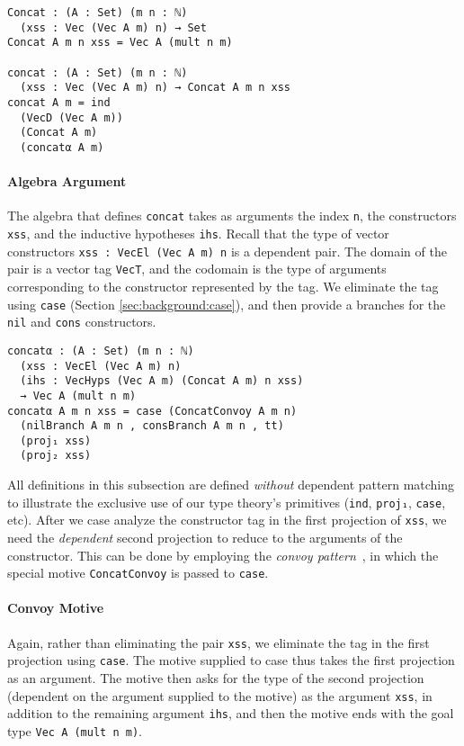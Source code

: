 \documentclass[preprint,nonatbib]{sigplanconf}
\newcommand{\refsec}[1]{Section \ref{sec:#1}}
\begin{document}
\begin{verbatim}
Concat : (A : Set) (m n : ℕ)
  (xss : Vec (Vec A m) n) → Set
Concat A m n xss = Vec A (mult n m)

concat : (A : Set) (m n : ℕ)
  (xss : Vec (Vec A m) n) → Concat A m n xss
concat A m = ind
  (VecD (Vec A m))
  (Concat A m)
  (concatα A m)
\end{verbatim}

\paragraph{Algebra Argument}

The algebra that defines {\tt concat} takes as arguments the index
{\tt n}, the constructors {\tt xss}, and the inductive hypotheses
{\tt ihs}. Recall that the type of vector constructors
{\tt xss : VecEl (Vec A m) n} is a dependent pair. The domain of the
pair is a vector tag {\tt VecT}, and the codomain is the type of
arguments corresponding to the constructor represented by the tag. We
eliminate the tag using {\tt case} (\refsec{background:case}), and
then provide a branches for the {\tt nil} and {\tt cons} constructors.

\begin{verbatim}
concatα : (A : Set) (m n : ℕ)
  (xss : VecEl (Vec A m) n)
  (ihs : VecHyps (Vec A m) (Concat A m) n xss)
  → Vec A (mult n m)
concatα A m n xss = case (ConcatConvoy A m n)
  (nilBranch A m n , consBranch A m n , tt)
  (proj₁ xss)
  (proj₂ xss)
\end{verbatim}

All definitions in this subsection are defined {\it without} dependent
pattern matching to illustrate the exclusive use of our type theory's
primitives ({\tt ind}, {\tt proj₁}, {\tt case}, etc). After we case
analyze the constructor tag in the first projection of {\tt xss}, we
need the {\it dependent} second projection to reduce to the arguments
of the constructor. This can be done by employing the
{\it convoy pattern}~\citep{chlipala2011certified}, in which the special motive
{\tt ConcatConvoy} is passed to {\tt case}.

\paragraph{Convoy Motive}

Again, rather than eliminating the pair {\tt xss}, we eliminate the
tag in the first projection using {\tt case}. The motive supplied to
case thus takes the first projection as an argument. The motive then
asks for the type of the second projection (dependent on the argument
supplied to the motive) as the argument {\tt xss}, in addition to the
remaining argument {\tt ihs}, and then the motive ends with the goal type
{\tt Vec A (mult n m)}.
\end{document}
